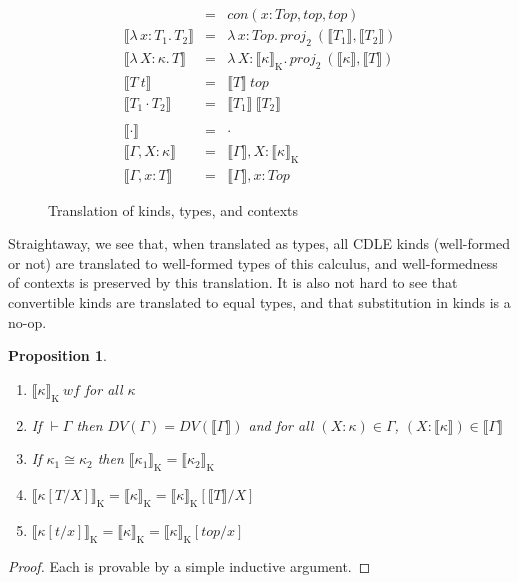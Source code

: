 \documentclass{article}
\newcommand{\abs}[4]{{#1}\, #2\! : \! #3.\, #4}
\newcommand{\interp}[1]{\llbracket #1 \rrbracket}
\newtheorem{proposition}[theorem]{Proposition}
\begin{document}
\begin{figure}
\[\begin{array}{lcl}
      & =
      & \mathit{con}(x\!:\!\mathit{Top},\mathit{top},\mathit{top})
      \\ \interp{\abs{\lambda}{x}{T_1}{T_2}}
      & =
      & \abs{\lambda}{x}{\mathit{Top}}{\mathit{proj}_2\ (\interp{T_1},\interp{T_2})}
      \\ \interp{\abs{\lambda}{X}{\kappa}{T}}
      & =
      & \abs{\lambda}{X}{\interp{\kappa}_{\text{K}}}{\mathit{proj_2}\ (\interp{\kappa},\interp{T})}
      \\ \interp{T\ t}
      & =
      & \interp{T}\ \mathit{top}
      \\ \interp{T_1 \cdot T_2}
      & =
      & \interp{T_1}\ \interp{T_2}
      \\ \\
      \interp{\cdot}
      & =
      & \cdot
      \\ \interp{\Gamma,X\!:\!\kappa}
      & =
      & \interp{\Gamma},X\!:\!\interp{\kappa}_{\text{K}}
      \\ \interp{\Gamma,x\!:\!T}
      & =
      & \interp{\Gamma},x\!:\!\mathit{Top}
    \end{array}
  \]
  \caption{Translation of kinds, types, and contexts}
  \label{fig:bespoke-trans}
\end{figure}

Straightaway, we see that, when translated as types, all CDLE kinds (well-formed
or not) are translated to well-formed types of this calculus, and
well-formedness of contexts is preserved by this translation.
It is also not hard to see that convertible kinds are translated to equal types,
and that substitution in kinds is a no-op.
\begin{proposition}
  \label{thm:stlc-kinds}
  \ \\
  \begin{enumerate}
  \item \(\interp{\kappa}_{\text{K}}\ \mathit{wf}\) for all \(\kappa\)
    
  \item If \(\vdash \Gamma\) then \(\mathit{DV}(\Gamma) =
    \mathit{DV}(\interp{\Gamma})\) and for all \((X\!:\!\kappa) \in \Gamma\),
    \((X\!:\!\interp{\kappa}) \in \interp{\Gamma}\)
  \item If \(\kappa_1 \cong \kappa_2\) then \(\interp{\kappa_1}_{\text{K}} = \interp{\kappa_2}_{\text{K}}\)
  \item \(\interp{\kappa[T/X]}_{\text{K}} = \interp{\kappa}_{\text{K}} = \interp{\kappa}_{\text{K}}
    [\interp{T}/X]\)
  \item \(\interp{\kappa[t/x]}_{\text{K}} = \interp{\kappa}_{\text{K}} = \interp{\kappa}_{\text{K}}[\mathit{top}/x]\)
  \end{enumerate}
\end{proposition}
\begin{proof}
  Each is provable by a simple inductive argument.
\end{proof}
\end{document}
